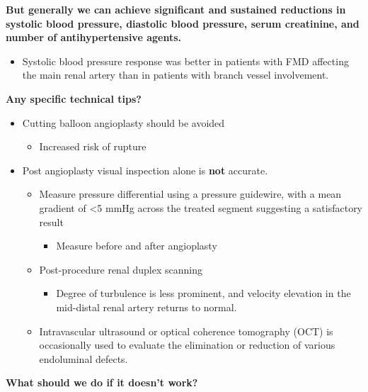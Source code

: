 \documentclass[
]{book}
\providecommand{\tightlist}{%
  \setlength{\itemsep}{0pt}\setlength{\parskip}{0pt}}
\begin{document}
\textbf{But generally we can achieve significant and sustained reductions in
systolic blood pressure, diastolic blood pressure, serum creatinine, and
number of antihypertensive agents.}

\begin{itemize}
\tightlist
\item
  Systolic blood pressure response was better in patients with FMD
  affecting the main renal artery than in patients with branch vessel
  involvement.
\end{itemize}

\textbf{Any specific technical tips?}

\begin{itemize}
\item
  Cutting balloon angioplasty should be avoided

  \begin{itemize}
  \tightlist
  \item
    Increased risk of rupture
  \end{itemize}
\item
  Post angioplasty visual inspection alone is \textbf{not} accurate.

  \begin{itemize}
  \item
    Measure pressure differential using a pressure guidewire, with a
    mean gradient of \textless5 mmHg across the treated segment suggesting
    a satisfactory result

    \begin{itemize}
    \tightlist
    \item
      Measure before and after angioplasty
    \end{itemize}
  \item
    Post-procedure renal duplex scanning

    \begin{itemize}
    \tightlist
    \item
      Degree of turbulence is less prominent, and velocity
      elevation in the mid-distal renal artery returns to normal.
    \end{itemize}
  \item
    Intravascular ultrasound or optical coherence tomography (OCT)
    is occasionally used to evaluate the elimination or reduction of
    various endoluminal defects.
  \end{itemize}
\end{itemize}

\textbf{What should we do if it doesn't work?}
\end{document}
